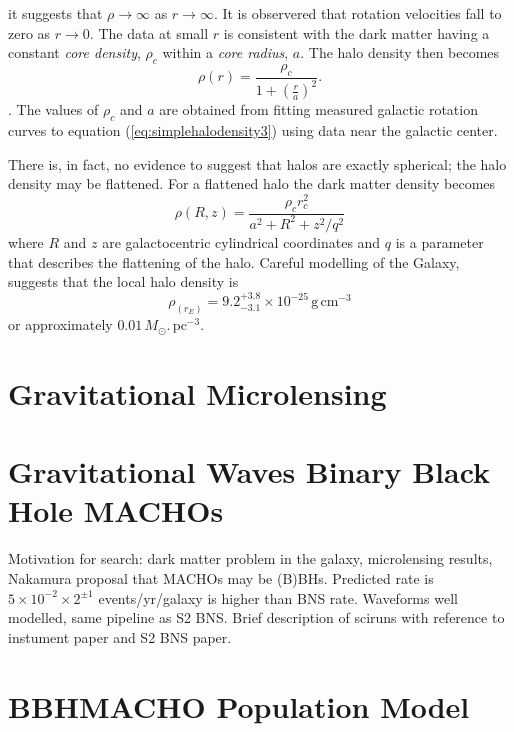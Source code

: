 it suggests that $\rho \rightarrow \infty$ as $r \rightarrow \infty$. It is
observered that rotation velocities fall to zero as $r\rightarrow 0$. The data
at small $r$ is consistent with the dark matter having a constant \emph{core
density}, $\rho_c$ within a \emph{core radius}, $a$. The halo density then
becomes
\begin{equation}
\rho(r) = \frac{\rho_c}{1 + \left(\frac{r}{a}\right)^2}.
\label{eq:simplehalodensity3}
\end{equation}.
The values of $\rho_c$ and $a$ are obtained from fitting measured galactic
rotation curves to equation (\ref{eq:simplehalodensity3}) using data near the
galactic center. 

There is, in fact, no evidence to suggest that halos are
exactly spherical; the halo density may be flattened\cite{Rix:1996}. For a
flattened halo the dark matter density becomes
\begin{equation}
\rho(R,z) = \frac{\rho_c r^2_c}{a^2 + R^2 + z^2/q^2}
\label{eq:simplehalodensity4}
\end{equation}
where $R$ and $z$ are galactocentric cylindrical coordinates and $q$ is a
parameter that describes the flattening of the halo. Careful modelling of the
Galaxy\cite{1995ApJ...449L.123G}, suggests that the local halo density is
\begin{equation}
\rho_(r_E) = 9.2_{-3.1}^{+3.8} \times 10^{-25}\,  \mathrm{g}\,\mathrm{cm}^{-3}
\end{equation}
or approximately $0.01\,M_\odot.\,\mathrm{pc}^{-3}$.

\section{Gravitational Microlensing}

\section{Gravitational Waves Binary Black Hole MACHOs}

Motivation for search: dark matter problem in the galaxy, microlensing
results, Nakamura proposal that MACHOs may be (B)BHs. Predicted rate is
$5\times10^{-2}\times2^{\pm 1}$ events/yr/galaxy is higher than BNS rate.
Waveforms well modelled, same pipeline as S2 BNS. Brief description of sciruns
with reference to instument paper and S2 BNS paper.

\section{BBHMACHO Population Model}

